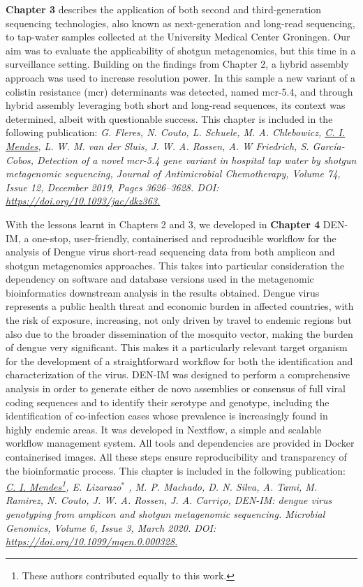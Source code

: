 \textbf{Chapter 3} describes the application of both second and third-generation sequencing technologies, also known as next-generation and long-read sequencing, to tap-water samples collected at the University Medical Center Groningen. Our aim was to evaluate the applicability of shotgun metagenomics, but this time in a surveillance setting. Building on the findings from Chapter 2, a hybrid assembly approach was used to increase resolution power. In this sample a new variant of a colistin resistance (mcr) determinants was detected, named mcr-5.4, and through hybrid assembly leveraging both short and long-read sequences, its context was determined, albeit with questionable success. This chapter is included in the following publication: \textit{G. Fleres, N. Couto, L. Schuele, M. A. Chlebowicz, \underline{C. I. Mendes}, L. W. M. van der Sluis, J. W. A. Rossen, A. W Friedrich, S. García-Cobos, Detection of a novel mcr-5.4 gene variant in hospital tap water by shotgun metagenomic sequencing, Journal of Antimicrobial Chemotherapy, Volume 74, Issue 12, December 2019, Pages 3626–3628.  DOI: \url{https://doi.org/10.1093/jac/dkz363.}}

With the lessons learnt in Chapters 2 and 3, we developed in \textbf{Chapter 4} DEN-IM, a one-stop, user-friendly, containerised and reproducible workflow for the analysis of Dengue virus short-read sequencing data from both amplicon and shotgun metagenomics approaches. This takes into particular consideration the dependency on software and database versions used in the metagenomic bioinformatics downstream analysis in the results obtained. Dengue virus represents a public health threat and economic burden in affected countries, with the risk of exposure, increasing, not only driven by travel to endemic regions but also due to the broader dissemination of the mosquito vector, making the burden of dengue very significant. This makes it a particularly relevant target organism for the development of a straightforward workflow for both the identification and characterization of the virus. DEN-IM was designed to perform a comprehensive analysis in order to generate either de novo assemblies or consensus of full viral coding sequences and to identify their serotype and genotype, including the identification of co-infection cases whose prevalence is increasingly found in highly endemic areas. It was developed in Nextflow,  a simple and scalable workflow management system. All tools and dependencies are provided in Docker containerised images. All these steps ensure reproducibility and transparency of the bioinformatic process. This chapter is included in the following publication: \textit{\underline{C. I. Mendes}\footnote[1]{These authors contributed equally to this work.}, E. Lizarazo$^*$ , M. P. Machado, D. N. Silva, A. Tami, M. Ramirez, N. Couto, J. W. A. Rossen, J. A. Carriço, DEN-IM: dengue virus genotyping from amplicon and shotgun metagenomic sequencing. Microbial Genomics, Volume 6, Issue 3, March 2020. DOI: \url{https://doi.org/10.1099/mgen.0.000328.}}

